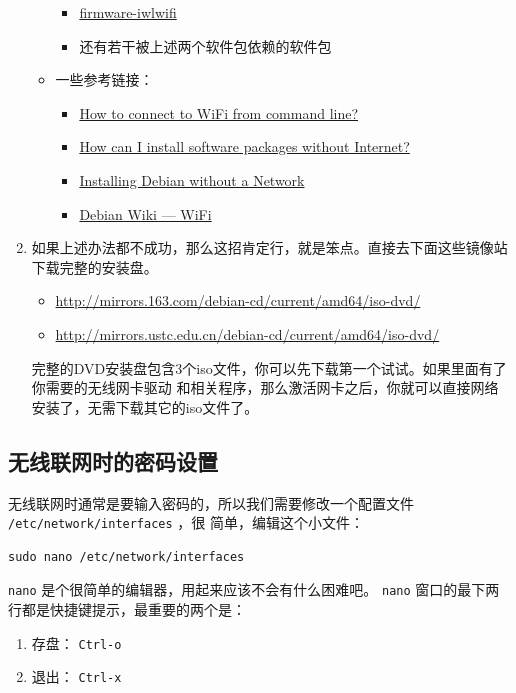 \documentclass{wx672ctexart} \usepackage{hyperref}
\begin{document}
\begin{enumerate}
\begin{itemize}
\begin{itemize}
\item \href{https://packages.debian.org/buster/firmware-iwlwifi}{firmware-iwlwifi}
\item 还有若干被上述两个软件包依赖的软件包
\end{itemize}
\item 一些参考链接：
\begin{itemize}
\item \href{https://unix.stackexchange.com/questions/283722/how-to-connect-to-wifi-from-command-line}{How to connect to WiFi from command line?}
\item \href{https://askubuntu.com/questions/974/how-can-i-install-software-or-packages-without-internet-offline}{How can I install software packages without Internet?}
\item \href{https://commandlinefanatic.com/cgi-bin/showarticle.cgi?article=art016}{Installing Debian without a Network}
\item \href{https://wiki.debian.org/WiFi}{Debian Wiki --- WiFi}
\end{itemize}
\end{itemize}
\item 如果上述办法都不成功，那么这招肯定行，就是笨点。直接去下面这些镜像站下载完整的安装盘。
\begin{itemize}
\item \url{http://mirrors.163.com/debian-cd/current/amd64/iso-dvd/}
\item \url{http://mirrors.ustc.edu.cn/debian-cd/current/amd64/iso-dvd/}
\end{itemize}

完整的DVD安装盘包含3个iso文件，你可以先下载第一个试试。如果里面有了你需要的无线网卡驱动
和相关程序，那么激活网卡之后，你就可以直接网络安装了，无需下载其它的iso文件了。
\end{enumerate}

\subsection{无线联网时的密码设置}
\label{sec:orgf9afa95}
无线联网时通常是要输入密码的，所以我们需要修改一个配置文件 \texttt{/etc/network/interfaces} ，很
简单，编辑这个小文件：
\begin{verbatim}
sudo nano /etc/network/interfaces
\end{verbatim}
\texttt{nano} 是个很简单的编辑器，用起来应该不会有什么困难吧。 
\texttt{nano} 窗口的最下两行都是快捷键提示，最重要的两个是：
\begin{enumerate}
\item 存盘： \texttt{Ctrl-o}
\item 退出： \texttt{Ctrl-x}
\end{enumerate}
\end{document}
